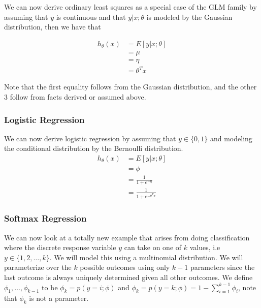 \documentclass[11pt]{exam}
\begin{document}
We can now derive ordinary least squares as a special case of the GLM family by assuming that $y$ is continuous and that $y|x;\theta$ is modeled by the Gaussian distribution, then we have that

\begin{align*}
h_\theta(x) &= E[y|x;\theta]\\
&= \mu\\
&= \eta\\
&= \theta^Tx
\end{align*}

Note that the first equality follows from the Gaussian distribution, and the other 3 follow from facts derived or assumed above.

\subsubsection{Logistic Regression}

We can now derive logistic regression by assuming that $y \in \{0,1\}$ and modeling the conditional distribution by the Bernoulli distribution.\\

\begin{align*}
h_\theta(x) &= E[y|x;\theta]\\
&= \phi\\
&= \frac{1}{1 + e^{-\eta}}\\
&= \frac{1}{1 + e^{-\theta^Tx}}\
\end{align*} 

\subsubsection{Softmax Regression}

We can now look at a totally new example that arises from doing classification where the discrete response variable $y$ can take on one of $k$ values, i.e $y \in \{1,2, \dots, k\}$. We will model this using a multinomial distribution. We will parameterize over the $k$ possible outcomes using only $k-1$ parameters since the last outcome is always uniquely determined given all other outcomes. We define $\phi_1, \dots, \phi_{k-1}$ to be $\phi_k = p(y=i;\phi)$ and $\phi_k = p(y = k; \phi) = 1 - \sum_{i=1}^{k-1}\phi_i$, note that $\phi_k$ is not a parameter.
\end{document}
